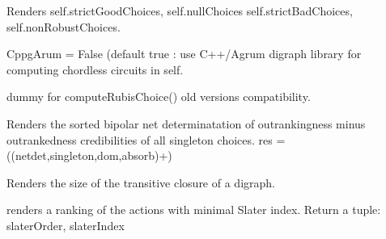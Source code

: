 \documentclass[letterpaper,10pt,english]{sphinxmanual}
\begin{document}
\begin{fulllineitems}
\begin{fulllineitems}
\end{fulllineitems}


\begin{fulllineitems}
\label{techDoc:digraphs.Digraph.computeRubisChoice}
Renders self.strictGoodChoices, self.nullChoices
self.strictBadChoices, self.nonRobustChoices.

CppgArum = False (default \textbar{} true : use C++/Agrum digraph library
for computing chordless circuits in self.

\end{fulllineitems}


\begin{fulllineitems}
\label{techDoc:digraphs.Digraph.computeRubyChoice}
dummy for computeRubisChoice()
old versions compatibility.

\end{fulllineitems}


\begin{fulllineitems}
\label{techDoc:digraphs.Digraph.computeSingletonRanking}
Renders the sorted bipolar net determinatation of outrankingness
minus outrankedness credibilities of all singleton choices.
res = ((netdet,singleton,dom,absorb)+)

\end{fulllineitems}


\begin{fulllineitems}
\label{techDoc:digraphs.Digraph.computeSizeTransitiveClosure}
Renders the size of the transitive closure of a digraph.

\end{fulllineitems}


\begin{fulllineitems}
\label{techDoc:digraphs.Digraph.computeSlaterOrder}
renders a ranking of the actions with minimal Slater index.
Return a tuple: slaterOrder, slaterIndex


\end{fulllineitems}
\end{fulllineitems}
\end{document}
